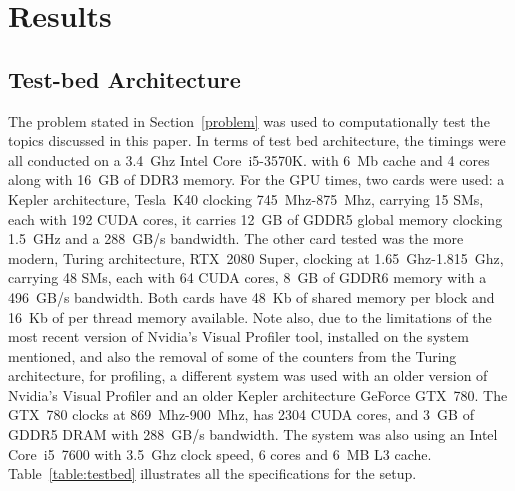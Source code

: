 \clearpage
\chapter{Results}

\section{Test-bed Architecture}

The problem stated in Section~\ref{problem} was used to computationally test the topics discussed in this paper. In terms of test bed architecture, the timings were all conducted on a 3.4~Ghz Intel Core~i5-3570K. with 6~Mb cache and 4 cores along with 16~GB of DDR3 memory. For the GPU times, two cards were used: a Kepler architecture, Tesla~K40 clocking 745~Mhz-875~Mhz, carrying 15 SMs, each with 192 CUDA cores, it carries 12~GB of GDDR5 global memory clocking 1.5~GHz and a 288~GB/s bandwidth. The other card tested was the more modern, Turing architecture, RTX~2080 Super, clocking at 1.65~Ghz-1.815~Ghz, carrying 48 SMs, each with 64 CUDA cores, 8~GB of GDDR6 memory with a 496~GB/s bandwidth. Both cards have 48~Kb of shared memory per block and 16~Kb of per thread memory available. Note also, due to the limitations of the most recent version of Nvidia's Visual Profiler tool, installed on the system mentioned, and also the removal of some of the counters from the Turing architecture, for profiling, a different system was used with an older version of Nvidia's Visual Profiler and an older Kepler architecture GeForce GTX~780. The GTX~780 clocks at 869~Mhz-900~Mhz, has 2304 CUDA cores, and 3~GB of GDDR5 DRAM with 288~GB/s bandwidth. The system was also using an Intel Core~i5~7600 with 3.5~Ghz clock speed, 6 cores and 6~MB L3 cache. Table~\ref{table:testbed} illustrates all the specifications for the setup.
\begin{table}
    \begin{center}
    \caption{Testbed architecture.}
	\label{table:testbed}
	\end{center}
\end{table}
